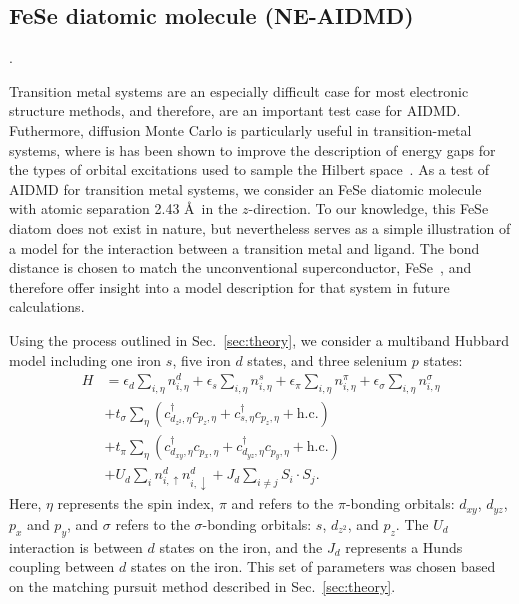 \subsection{FeSe diatomic molecule (NE-AIDMD)}
.


Transition metal systems are an especially difficult case for most electronic structure methods, and therefore, are an important test case for AIDMD.
Futhermore, diffusion Monte Carlo is particularly useful in transition-metal systems, where is has been shown to improve the description of energy gaps for the types of orbital excitations used to sample the Hilbert space~\cite{lucas}.
As a test of AIDMD for transition metal systems, we consider an FeSe diatomic molecule with atomic separation 2.43 \AA~in the $z$-direction.
To our knowledge, this FeSe diatom does not exist in nature, but nevertheless serves as a simple illustration of a model for the interaction between a transition metal and ligand.
The bond distance is chosen to match the unconventional superconductor, FeSe~\cite{fese}, and therefore offer insight into a model description for that system in future calculations.

Using the process outlined in Sec.~\ref{sec:theory}, we consider a multiband Hubbard model including one iron $s$, five iron $d$ states, and three selenium $p$ states:
\begin{align*}
  H 
  &=
  \epsilon_d \sum_{i,\eta} n^{d}_{i,\eta} 
  +
  \epsilon_s \sum_{i,\eta} n^{s}_{i,\eta} 
  +
  \epsilon_\pi \sum_{i,\eta} n^{\pi}_{i,\eta} 
  +
  \epsilon_\sigma \sum_{i,\eta} n^{\sigma}_{i,\eta} 
  \\
  &+ 
  t_{\sigma} \sum_{\eta} \left( c_{d_{z^2},\eta}^{\dagger} c_{p_z,\eta} + c_{s,\eta}^{\dagger}  c_{p_z,\eta} + \text{h.c.} \right)
  \\
  &+ 
  t_{\pi} \sum_{\eta} \left( c_{d_{xy},\eta}^{\dagger} c_{p_x,\eta} + c_{d_{yz},\eta}^{\dagger}  c_{p_y,\eta} + \text{h.c.} \right)
  \\
  &+
  U_d \sum_{i} n^{d}_{i,\uparrow} n^{d}_{i,\downarrow} 
  +
  J_d \sum_{i\ne j} S_i \cdot S_j.
\end{align*}
Here, $\eta$ represents the spin index, $\pi$ and refers to the $\pi$-bonding orbitals: $d_{xy}$, $d_{yz}$, $p_x$ and $p_y$, and $\sigma$ refers to the $\sigma$-bonding orbitals: $s$, $d_{z^2}$, and $p_z$. 
The $U_d$ interaction is between $d$ states on the iron, and the $J_d$ represents a Hunds coupling between $d$ states on the iron.
This set of parameters was chosen based on the matching pursuit method described in Sec.~\ref{sec:theory}.


